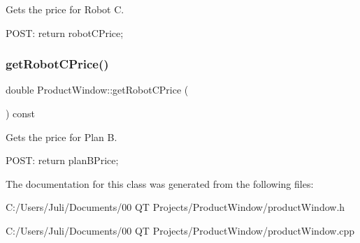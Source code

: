 Gets the price for Robot C. 

P\+O\+ST\+: return robot\+C\+Price; \mbox{\label{class_product_window_a66832cd0d36260949da84db6afa21a92}} 
\subsubsection{\texorpdfstring{getRobotCPrice()}{getRobotCPrice()}}
{\footnotesize\ttfamily double Product\+Window\+::get\+Robot\+C\+Price (\begin{DoxyParamCaption}{ }\end{DoxyParamCaption}) const}



Gets the price for Plan B. 

P\+O\+ST\+: return plan\+B\+Price; 

The documentation for this class was generated from the following files\+:\begin{DoxyCompactItemize}
\item 
C\+:/\+Users/\+Juli/\+Documents/00 Q\+T Projects/\+Product\+Window/product\+Window.\+h\item 
C\+:/\+Users/\+Juli/\+Documents/00 Q\+T Projects/\+Product\+Window/product\+Window.\+cpp\end{DoxyCompactItemize}
